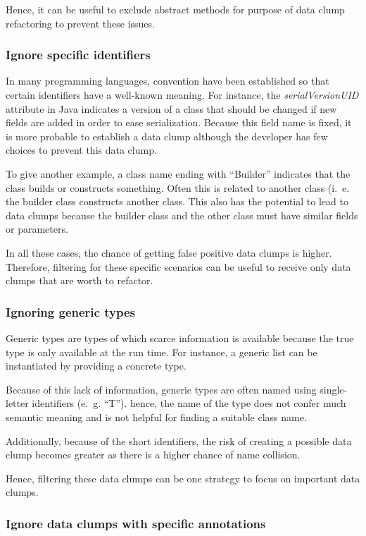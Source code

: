 Hence, it can be useful to exclude abstract methods for purpose of data clump refactoring to prevent these issues. 

\subsubsection{Ignore specific identifiers}

In many programming languages, convention have been established so that certain identifiers have a well-known meaning. For instance, the \textit{serialVersionUID} attribute in Java indicates a version of a class that should be changed if new fields are added in order to ease serialization. Because this field name is fixed, it is more probable to establish a data clump although the developer has few choices to prevent this data clump.

To give another example, a class name ending with \enquote{Builder} indicates that the class builds or constructs something. Often this is related to another class (i.~e. the builder class constructs another class. This also has the potential to lead to data clumps because the builder class and the other class must have similar fields or parameters. 

In all these cases, the chance of getting false positive data clumps is higher. Therefore, filtering for these specific scenarios can be useful to receive only data clumps that are worth to refactor. 

\subsubsection{Ignoring generic types}
Generic types are types of which scarce information is available because the true type is only available at the run time. For instance, a generic list can be instantiated by providing a concrete type.

Because of this lack of information, generic types are often named using  single-letter identifiers (e.~g. \enquote{T}). hence, the name of the type does not confer much semantic meaning and is not helpful for finding a suitable class name. 

Additionally, because of the short identifiers, the risk of creating a possible data clump becomes greater as there is a higher chance of name collision.

Hence, filtering these data clumps can be one strategy to focus on important data clumps. 

\subsubsection{Ignore data clumps with specific annotations}

